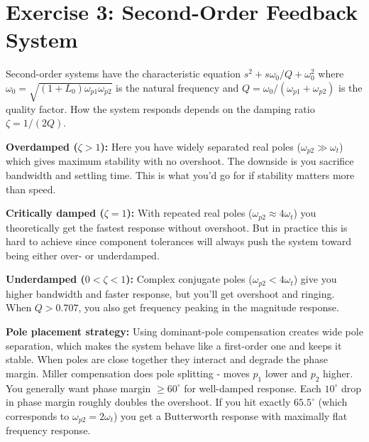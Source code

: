 \documentclass[main.tex]{subfiles}
\begin{document}
\section{Exercise 3: Second-Order Feedback System}

Second-order systems have the characteristic equation $s^2 + s\omega_0/Q + \omega_0^2$ where $\omega_0 = \sqrt{(1+L_0)\omega_{p1}\omega_{p2}}$ is the natural frequency and $Q = \omega_0/(\omega_{p1}+\omega_{p2})$ is the quality factor. How the system responds depends on the damping ratio $\zeta = 1/(2Q)$.

\textbf{Overdamped ($\zeta > 1$):} Here you have widely separated real poles ($\omega_{p2} \gg \omega_t$) which gives maximum stability with no overshoot. The downside is you sacrifice bandwidth and settling time. This is what you'd go for if stability matters more than speed.

\textbf{Critically damped ($\zeta = 1$):} With repeated real poles ($\omega_{p2} \approx 4\omega_t$) you theoretically get the fastest response without overshoot. But in practice this is hard to achieve since component tolerances will always push the system toward being either over- or underdamped.

\textbf{Underdamped ($0 < \zeta < 1$):} Complex conjugate poles ($\omega_{p2} < 4\omega_t$) give you higher bandwidth and faster response, but you'll get overshoot and ringing. When $Q > 0.707$, you also get frequency peaking in the magnitude response.

\textbf{Pole placement strategy:} Using dominant-pole compensation creates wide pole separation, which makes the system behave like a first-order one and keeps it stable. When poles are close together they interact and degrade the phase margin. Miller compensation does pole splitting - moves $p_1$ lower and $p_2$ higher. You generally want phase margin $\geq 60^\circ$ for well-damped response. Each $10^\circ$ drop in phase margin roughly doubles the overshoot. If you hit exactly $65.5^\circ$ (which corresponds to $\omega_{p2} = 2\omega_t$) you get a Butterworth response with maximally flat frequency response.
\end{document}
